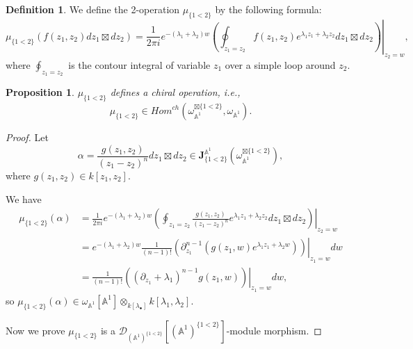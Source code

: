 \documentclass[11pt]{amsart}
\newtheorem{prop}[thm]{Proposition}
\theoremstyle{definition}
\newtheorem{defn}[thm]{Definition}
\theoremstyle{remark}
\numberwithin{equation}{section}
\begin{document}
\begin{defn}
    We define the 2-operation $\mu_{\{1<2\}}$ by the following formula:
    $$
    \mu_{\{1<2\}}(f(z_{1},z_{2})dz_{1}\boxtimes dz_{2})=\frac{1}{2\pi i}e^{-(\lambda_{1}+\lambda_{2})w}\left. \left(\oint_{z_{1}=z_2}f(z_{1},z_{2})e^{\lambda_{1}z_{1}+\lambda_{2}z_{2}}dz_{1}\boxtimes dz_{2}\right)\right|_{z_{2}=w},
    $$
    where $\oint_{z_{1}=z_{2}}$ is the contour integral of variable $z_{1}$ over a simple loop around $z_{2}$.
\end{defn}
\begin{prop}
    $\mu_{\{1<2\}}$ defines a chiral operation, i.e., 
    $$    \mu_{\{1<2\}}\in {Hom}^{ch}(\omega_{\mathbb{A}^{1}}^{\boxtimes \{1<2\}},\omega_{\mathbb{A}^{1}}).
    $$
\end{prop}
\begin{proof}
    Let 
$$\alpha=\frac{g(z_{1},z_{2})}{(z_{1}-z_{2})^{n}}dz_{1}\boxtimes dz_{2}\in \mathbf{J}^{\mathbb{A}^1}_{\{1<2\}}(\omega_{\mathbb{A}^1}^{\boxtimes\{1<2\}}),
$$
where $g(z_{1},z_{2})\in k[z_{1},z_{2}]$.

We have
\begin{align*}
 \mu_{\{1<2\}}(\alpha)
 &=\frac{1}{2\pi i}e^{-(\lambda_{1}+\lambda_{2})w}\left. \left(\oint_{z_{1}=z_2}\frac{g(z_{1},z_{2})}{(z_{1}-z_{2})^{n}}e^{\lambda_{1}z_{1}+\lambda_{2}z_{2}}dz_{1}\boxtimes dz_{2}\right)\right|_{z_{2}=w}\\
 &= e^{-(\lambda_{1}+\lambda_{2})w}\frac{1}{(n-1)!}\left.\left(\partial_{z_{1}}^{n-1}\left(g(z_{1},w)e^{\lambda_{1}z_{1}+\lambda_{2}w}\right)\right)\right|_{z_{1}=w}dw
 \\
 &=\frac{1}{(n-1)!}
\left.\left((\partial_{z_{1}}+\lambda_{1})^{n-1}g(z_{1},w)\right)\right|_{z_{1}=w}dw,
\end{align*}
so $\mu_{\{1<2\}}(\alpha)\in \omega_{\mathbb{A}^{1}}[\mathbb{A}^{1}]\otimes_{k[\lambda_{\bullet}]}k[\lambda_{1},\lambda_{2}].$

Now we prove $\mu_{\{1<2\}}$ is a $\mathcal{D}_{(\mathbb{A}^{1})^{\{1<2\}}}[(\mathbb{A}^{1})^{\{1<2\}}]$-module morphism.


\end{proof}
\end{document}
